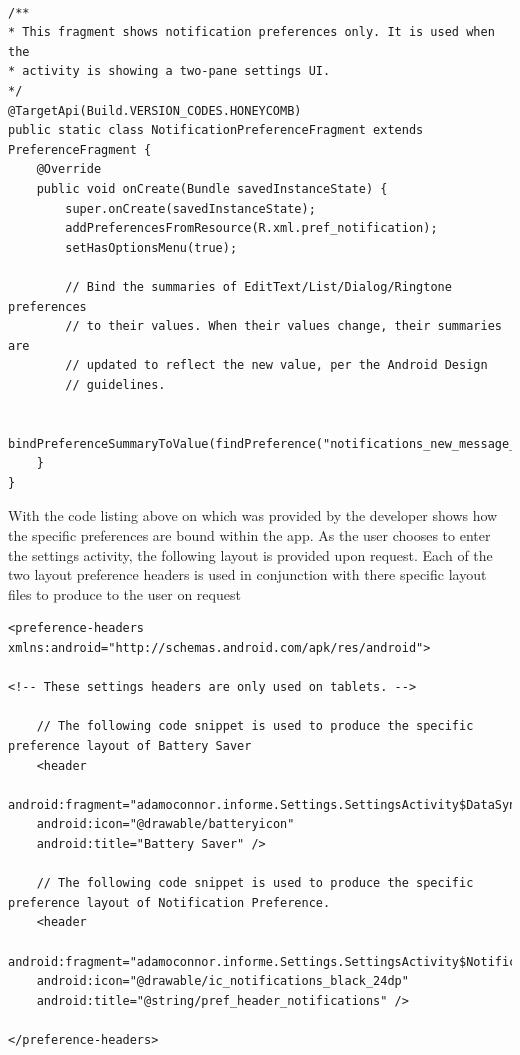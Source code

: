 \begin{lstlisting}[style=myCustomMatlabStyle, basicstyle=\small, breaklines, caption=Preferences Example,captionpos=b] 

/**
* This fragment shows notification preferences only. It is used when the
* activity is showing a two-pane settings UI.
*/
@TargetApi(Build.VERSION_CODES.HONEYCOMB)
public static class NotificationPreferenceFragment extends PreferenceFragment {
    @Override
    public void onCreate(Bundle savedInstanceState) {
        super.onCreate(savedInstanceState);
        addPreferencesFromResource(R.xml.pref_notification);
        setHasOptionsMenu(true);
        
        // Bind the summaries of EditText/List/Dialog/Ringtone preferences
        // to their values. When their values change, their summaries are
        // updated to reflect the new value, per the Android Design
        // guidelines.
        
        bindPreferenceSummaryToValue(findPreference("notifications_new_message_ringtone"));
    }
}

\end{lstlisting}
With the code listing above on which was provided by the developer shows how the specific preferences are bound within the app.  As the user chooses to enter the settings activity, the following layout is provided upon request. Each of the two layout preference headers is used in conjunction with there specific layout files to produce to the user on request\newline
\begin{lstlisting}[style=myCustomMatlabStyle, basicstyle=\small, breaklines, caption=Preferences Header Layout Example,captionpos=b] 
<preference-headers xmlns:android="http://schemas.android.com/apk/res/android">

<!-- These settings headers are only used on tablets. -->

    // The following code snippet is used to produce the specific preference layout of Battery Saver
    <header
    android:fragment="adamoconnor.informe.Settings.SettingsActivity$DataSyncPreferenceFragment"
    android:icon="@drawable/batteryicon"
    android:title="Battery Saver" />

    // The following code snippet is used to produce the specific preference layout of Notification Preference.
    <header
    android:fragment="adamoconnor.informe.Settings.SettingsActivity$NotificationPreferenceFragment"
    android:icon="@drawable/ic_notifications_black_24dp"
    android:title="@string/pref_header_notifications" />

</preference-headers>
\end{lstlisting}
